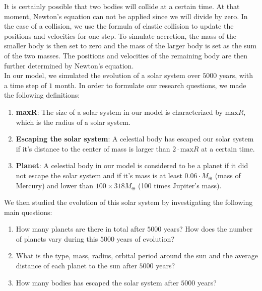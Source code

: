 It is certainly possible that two bodies will collide at a certain time. 
At that moment, Newton's equation can not be applied since we will divide by zero. 
In the case of a collision, we use the formula of elastic collision to update the positions and velocities for one step. 
To simulate accretion, the mass of the smaller body is then set to zero and the mass of the larger body is set as the sum of the two masses. 
The positions and velocities of the remaining body are then further determined by Newton's equation.\\

In our model, we simulated the evolution of a solar system over $5000$ years, with a time step of $1$ month. 
In order to formulate our research questions, we made the following definitions:\\
\begin{enumerate}
\item \textbf{maxR}: The size of a solar system in our model is characterized by $\text{max}R$, which is the radius of a solar system. 
\item \textbf{Escaping the solar system}: A celestial body has escaped our solar system if it's distance to the center of mass is larger than $2\cdot\text{max}R$ at a certain time.
\item \textbf{Planet}: A celestial body in our model is considered to be a planet if it did not escape the solar system and if it's mass is at least $0.06\cdot M_{\oplus}$ (mass of Mercury) and lower than $100\times 318M_{\oplus}$ (100 times Jupiter's mass).
\end{enumerate}
We then studied the evolution of this solar system by investigating the following main questions:
\begin{enumerate}
	\item  How many planets are there in total after $5000$ years? 
	How does the number of planets vary during this $5000$ years of evolution?

	\item What is the type, mass, radius, orbital period around the sun and the average distance of each planet to the sun after $5000$ years?

	\item How many bodies has escaped the solar system after $5000$ years?

\end{enumerate}
 